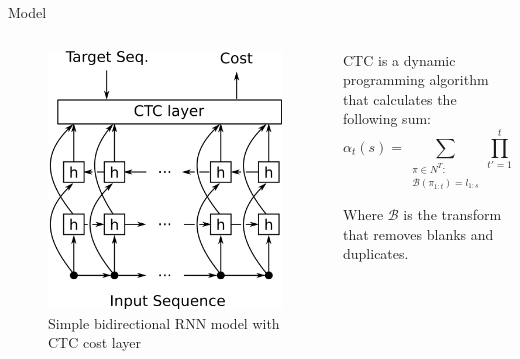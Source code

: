 \documentclass[final]{beamer}
\newlength{\onecolwid}
\newlength{\twocolwid}
\begin{document}
\begin{frame}[t]
\begin{columns}[t]
\begin{column}{\twocolwid}
\begin{block}{Model}
\begin{columns}[t,totalwidth=\twocolwid]
\begin{column}{\onecolwid}
\vspace{1em}
\begin{figure}
\includegraphics[width=0.8\linewidth]{azerty4.png}
\caption{Simple bidirectional RNN model with CTC cost layer}
\end{figure}


\end{column} %

\begin{column}{\onecolwid} %


CTC is a dynamic programming algorithm that calculates the following sum:
\[
\alpha_t(s) = \sum_{\substack{\pi \in N^T :\\\mathcal{B}(\pi_{1:t}) = l_{1:s}}} 
	\prod_{t'=1}^t y_{\pi_{t'}}^{t'}
\]

Where $\mathcal{B}$ is the transform that removes blanks and duplicates.


\end{column}
\end{columns}
\end{block}
\end{column}
\end{columns}
\end{frame}
\end{document}
